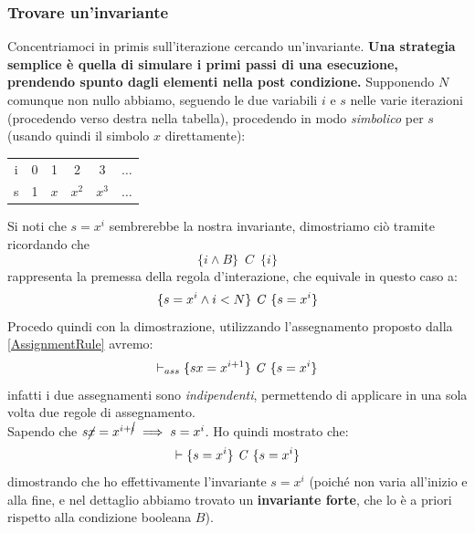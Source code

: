 \begin{esempio}
				      			\subsubsection{Trovare un'invariante}
				      			Concentriamoci in primis sull'iterazione cercando un'invariante. \textbf{Una strategia
				      			semplice è quella di simulare i primi passi di una esecuzione, prendendo spunto dagli elementi nella post condizione.} Supponendo $N$
				      			comunque non nullo abbiamo, seguendo le due variabili $i$ e $s$ nelle varie
				      			iterazioni (procedendo verso destra nella tabella), procedendo in modo
				      			\textit{simbolico} per $s$ (usando quindi il simbolo $x$ direttamente):
				      			\begin{table}[H]
				      				\centering
				      				\begin{tabular}[H]{c|ccccc}
				      					i & 0 & 1   & 2     & 3     & $\ldots$ \\
				      					s & 1 & $x$ & $x^2$ & $x^3$ & $\ldots$ 
				      				\end{tabular}
				      			\end{table}
				      			Si noti che $s= x^i$ sembrerebbe la nostra invariante, dimostriamo ciò tramite ricordando che 
				      			\[\{i\land B\}\,\,\, C\,\,\,\{i\}\] rappresenta la premessa della regola d'interazione, che equivale in questo caso a:
				      			\[\{s=x^i\land i<N\}\mbox{ \textit{C} }\{s=x^i\}\]
				      			Procedo quindi con la dimostrazione, utilizzando l'assegnamento proposto dalla \ref{AssignmentRule} avremo:
				      			\[\vdash_{ass}\{sx=x^{i+1}\}\mbox{ \textit{C} }\{s=x^i\}\]
				      			infatti i due assegnamenti sono \emph{indipendenti}, permettendo di applicare
				      			in una sola volta due regole di assegnamento.\\
				      			Sapendo che $s\cancel{x}=x^{i+\cancel{i}}\implies s=x^i$. Ho quindi mostrato
				      			che:
				      			\[\vdash \{s=x^i\}\mbox{ \textit{C} }\{s=x^i\}\]
				      			dimostrando che ho effettivamente l'invariante $s= x^i$ (poiché non varia all'inizio e alla fine, e nel dettaglio
				      			abbiamo trovato un \textbf{invariante forte}, che lo è a priori rispetto alla
				      			condizione booleana $B$).\\
				      							      			  

\end{esempio}
